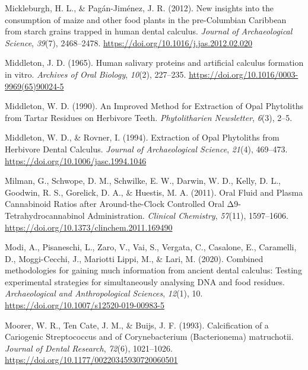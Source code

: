 \documentclass[
  letterpaper,
]{book}
\newlength{\cslhangindent}
\newlength{\cslentryspacingunit} %
\newenvironment{CSLReferences}[2] %
 {%
  \setlength{\parindent}{0pt}
  \ifodd #1
  \let\oldpar\par
  \def\par{\hangindent=\cslhangindent\oldpar}
  \fi
  \setlength{\parskip}{#2\cslentryspacingunit}
 }%
 {}
\begin{document}
\begin{CSLReferences}{1}{0}
\leavevmode{}%
Mickleburgh, H. L., \& Pagán-Jiménez, J. R. (2012). New insights into
the consumption of maize and other food plants in the pre-{Columbian
Caribbean} from starch grains trapped in human dental calculus.
\emph{Journal of Archaeological Science}, \emph{39}(7), 2468--2478.
\url{https://doi.org/10.1016/j.jas.2012.02.020}

\leavevmode{}%
Middleton, J. D. (1965). Human salivary proteins and artificial calculus
formation in vitro. \emph{Archives of Oral Biology}, \emph{10}(2),
227--235. \url{https://doi.org/10.1016/0003-9969(65)90024-5}

\leavevmode{}%
Middleton, W. D. (1990). An {Improved Method} for {Extraction} of {Opal
Phytoliths} from {Tartar Residues} on {Herbivore Teeth}.
\emph{Phytolitharien Newsletter}, \emph{6}(3), 2--5.

\leavevmode{}%
Middleton, W. D., \& Rovner, I. (1994). Extraction of {Opal Phytoliths}
from {Herbivore Dental Calculus}. \emph{Journal of Archaeological
Science}, \emph{21}(4), 469--473.
\url{https://doi.org/10.1006/jasc.1994.1046}

\leavevmode{}%
Milman, G., Schwope, D. M., Schwilke, E. W., Darwin, W. D., Kelly, D.
L., Goodwin, R. S., Gorelick, D. A., \& Huestis, M. A. (2011). Oral
{Fluid} and {Plasma Cannabinoid Ratios} after {Around-the-Clock
Controlled Oral Δ9-Tetrahydrocannabinol Administration}. \emph{Clinical
Chemistry}, \emph{57}(11), 1597--1606.
\url{https://doi.org/10.1373/clinchem.2011.169490}

\leavevmode{}%
Modi, A., Pisaneschi, L., Zaro, V., Vai, S., Vergata, C., Casalone, E.,
Caramelli, D., Moggi-Cecchi, J., Mariotti Lippi, M., \& Lari, M. (2020).
Combined methodologies for gaining much information from ancient dental
calculus: Testing experimental strategies for simultaneously analysing
{DNA} and food residues. \emph{Archaeological and Anthropological
Sciences}, \emph{12}(1), 10.
\url{https://doi.org/10.1007/s12520-019-00983-5}

\leavevmode{}%
Moorer, W. R., Ten Cate, J. M., \& Buijs, J. F. (1993). Calcification of
a {Cariogenic Streptococcus} and of {Corynebacterium} ({Bacterionema})
matruchotii. \emph{Journal of Dental Research}, \emph{72}(6),
1021--1026. \url{https://doi.org/10.1177/00220345930720060501}


\end{CSLReferences}
\end{document}
